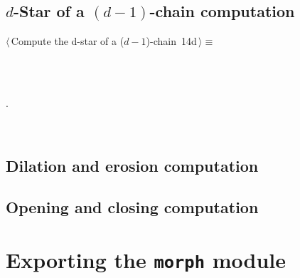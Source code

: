 \documentclass[11pt,oneside]{article}	%
\begin{document}
\subsection{$d$-Star of a $(d-1)$-chain computation}

\begin{flushleft} \small
\begin{minipage}{\linewidth} \label{scrap25}
\protect{}$\langle\,$Compute the d-star of a ($d-1$)-chain\nobreak\ {\footnotesize 14d}$\,\rangle\equiv$
\vspace{-1ex}
\begin{list}{}{} \item
\mbox{}\verb@@\\
\mbox{}\verb@@\\
\mbox{}\verb@@{\NWsep}
\end{list}
\vspace{-1ex}
\footnotesize\addtolength{\baselineskip}{-1ex}
\begin{list}{}{\setlength{\itemsep}{-\parsep}\setlength{\itemindent}{-\leftmargin}}
\item {\NWtxtMacroNoRef}.
\end{list}
\end{minipage}\\[4ex]
\end{flushleft}


\subsection{Dilation and erosion computation}



\subsection{Opening and closing computation}




\section{Exporting the \texttt{morph} module}
\end{document}
